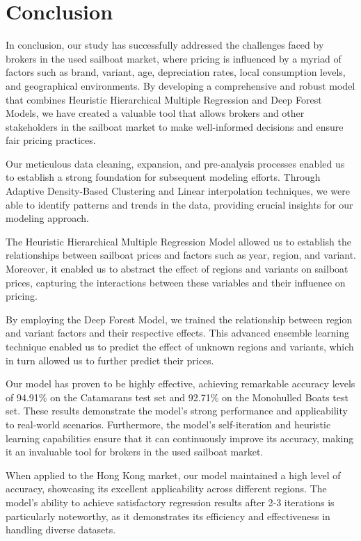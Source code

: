 \documentclass[12pt]{article}  %
\begin{document}
\section{Conclusion}
In conclusion, our study has successfully addressed the challenges faced by brokers in the used sailboat market, where pricing is influenced by a myriad of factors such as brand, variant, age, depreciation rates, local consumption levels, and geographical environments. By developing a comprehensive and robust model that combines Heuristic Hierarchical Multiple Regression and Deep Forest Models, we have created a valuable tool that allows brokers and other stakeholders in the sailboat market to make well-informed decisions and ensure fair pricing practices.

Our meticulous data cleaning, expansion, and pre-analysis processes enabled us to establish a strong foundation for subsequent modeling efforts. Through Adaptive Density-Based Clustering and Linear interpolation techniques, we were able to identify patterns and trends in the data, providing crucial insights for our modeling approach.

The Heuristic Hierarchical Multiple Regression Model allowed us to establish the relationships between sailboat prices and factors such as year, region, and variant. Moreover, it enabled us to abstract the effect of regions and variants on sailboat prices, capturing the interactions between these variables and their influence on pricing.

By employing the Deep Forest Model, we trained the relationship between region and variant factors and their respective effects. This advanced ensemble learning technique enabled us to predict the effect of unknown regions and variants, which in turn allowed us to further predict their prices.

Our model has proven to be highly effective, achieving remarkable accuracy levels of 94.91\% on the Catamarans test set and 92.71\% on the Monohulled Boats test set. These results demonstrate the model's strong performance and applicability to real-world scenarios. Furthermore, the model's self-iteration and heuristic learning capabilities ensure that it can continuously improve its accuracy, making it an invaluable tool for brokers in the used sailboat market.

When applied to the Hong Kong market, our model maintained a high level of accuracy, showcasing its excellent applicability across different regions. The model's ability to achieve satisfactory regression results after 2-3 iterations is particularly noteworthy, as it demonstrates its efficiency and effectiveness in handling diverse datasets.
\end{document}
